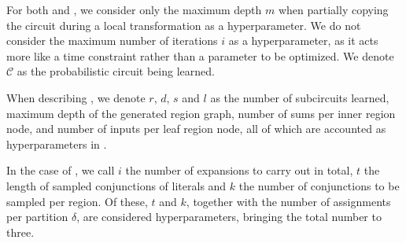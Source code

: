 For both  and , we consider only the maximum depth $m$ when
partially copying the circuit during a local transformation as a hyperparameter. We do not consider
the maximum number of iterations $i$ as a hyperparameter, as it acts more like a time constraint
rather than a parameter to be optimized. We denote $\mathcal{C}$ as the probabilistic circuit
being learned.

When describing , we denote $r$, $d$, $s$ and $l$ as the number of subcircuits
learned, maximum depth of the generated region graph, number of sums per inner region node, and
number of inputs per leaf region node, all of which are accounted as hyperparameters in
.

In the case of , we call $i$ the number of expansions to carry out in total, $t$ the
length of sampled conjunctions of literals and $k$ the number of conjunctions to be sampled per
region. Of these, $t$ and $k$, together with the number of assignments per partition $\delta$, are
considered  hyperparameters, bringing the total number to three.

